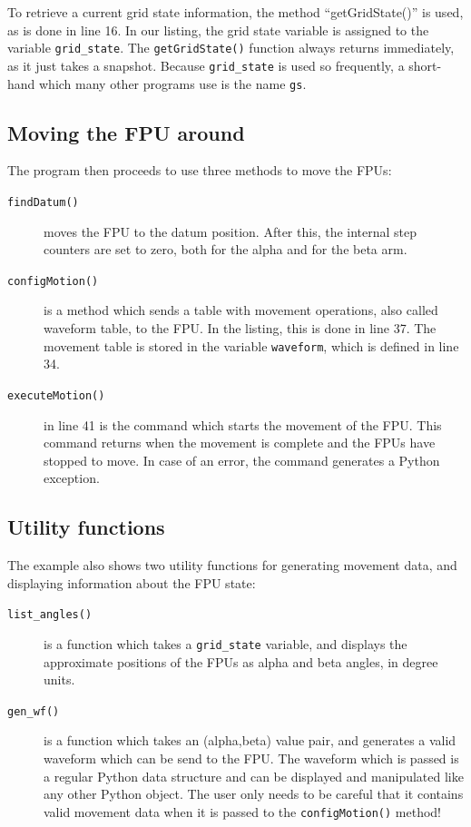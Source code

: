 \documentclass{scrartcl}[12pt,a4paper]
\begin{document}
To retrieve a current grid state information, the method
``getGridState()'' is used, as is done in line 16. In our listing, the
grid state variable is assigned to the variable \texttt{grid\_state}.
The \texttt{getGridState()} function always returns immediately, as it
just takes a snapshot. Because \texttt{grid\_state} is used so
frequently, a short-hand which many other programs use is the name
\texttt{gs}.

\subsection{Moving the FPU around}

The program then proceeds to use three methods to move
the FPUs:

\begin{description}
\item[\texttt{findDatum()}] moves the FPU to the datum position. After this,
  the internal step counters are set to zero, both for the alpha and
  for the beta arm.

\item[\texttt{configMotion()}] is a method which sends a table with movement
  operations, also called waveform table, to the FPU. In the listing,
  this is done in line 37. The movement table is stored in the
  variable \texttt{waveform}, which is defined in line 34.

\item[\texttt{executeMotion()}] in line 41 is the command which starts
  the movement of the FPU. This command returns when the movement is
  complete and the FPUs have stopped to move. In case of an error, the
  command generates a Python exception.

\end{description}

\subsection{Utility functions}

The example also shows two utility functions for generating movement
data, and displaying information about the FPU state:

\begin{description}
\item[\texttt{list\_angles()}] is a function which takes a \texttt{grid\_state}
  variable, and displays the approximate positions of the FPUs as
  alpha and beta angles, in degree units.

\item[\texttt{gen\_wf()}] is a function which takes an (alpha,beta)
  value pair, and generates a valid waveform which can be send to the
  FPU.  The waveform which is passed is a regular Python data
  structure and can be displayed and manipulated like any other Python
  object.  The user only needs to be careful that it contains valid
  movement data when it is passed to the \texttt{configMotion()}
  method!

\end{description}
\end{document}
